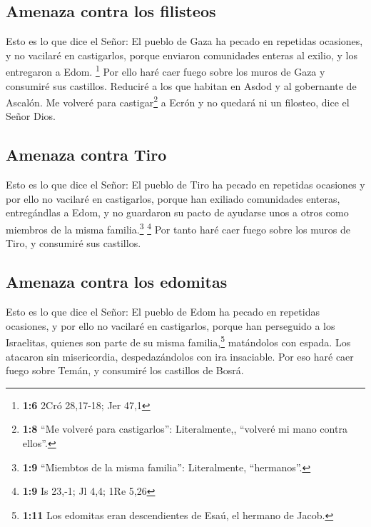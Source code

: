 \hypertarget{amenaza-contra-los-filisteos}{%
\subsection{Amenaza contra los
filisteos}\label{amenaza-contra-los-filisteos}}

 Esto es lo que dice el Señor: El pueblo de Gaza ha pecado
en repetidas ocasiones, y no vacilaré en castigarlos, porque enviaron
comunidades enteras al exilio, y los entregaron a Edom. \footnote{\textbf{1:6}
  2Cró 28,17-18; Jer 47,1}  Por ello haré caer fuego sobre
los muros de Gaza y consumiré sus castillos.  Reduciré a
los que habitan en Asdod y al gobernante de Ascalón. Me volveré para
castigar\footnote{\textbf{1:8} ``Me volveré para castigarlos'':
  Literalmente,, ``volveré mi mano contra ellos''.} a Ecrón y no quedará
ni un filosteo, dice el Señor Dios.

\hypertarget{amenaza-contra-tiro}{%
\subsection{Amenaza contra Tiro}\label{amenaza-contra-tiro}}

 Esto es lo que dice el Señor: El pueblo de Tiro ha pecado
en repetidas ocasiones y por ello no vacilaré en castigarlos, porque han
exiliado comunidades enteras, entregándlas a Edom, y no guardaron su
pacto de ayudarse unos a otros como miembros de la misma
familia.\footnote{\textbf{1:9} ``Miembtos de la misma familia'':
  Literalmente, ``hermanos''.} \footnote{\textbf{1:9} Is 23,-1; Jl 4,4;
  1Re 5,26}  Por tanto haré caer fuego sobre los muros de
Tiro, y consumiré sus castillos.

\hypertarget{amenaza-contra-los-edomitas}{%
\subsection{Amenaza contra los
edomitas}\label{amenaza-contra-los-edomitas}}

 Esto es lo que dice el Señor: El pueblo de Edom ha
pecado en repetidas ocasiones, y por ello no vacilaré en castigarlos,
porque han perseguido a los Israelitas, quienes son parte de su misma
familia,\footnote{\textbf{1:11} Los edomitas eran descendientes de Esaú,
  el hermano de Jacob.} matándolos con espada. Los atacaron sin
misericordia, despedazándolos con ira insaciable.  Por
eso haré caer fuego sobre Temán, y consumiré los castillos de Bosrá.

